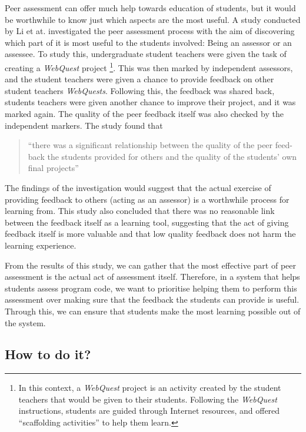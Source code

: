 \documentclass[a4paper,11pt]{report}
\begin{document}
Peer assessment can offer much help towards education of students, but it would be worthwhile to know just which aspects are the most useful. A study conducted by Li et at. \cite{li_assessor_2010} investigated the peer assessment process with the aim of discovering which part of it is most useful to the students involved: Being an assessor or an assessee. To study this, undergraduate student teachers were given the task of creating a \textit{WebQuest} project \footnote{In this context, a \textit{WebQuest} project is an activity created by the student teachers that would be given to their students. Following the \textit{WebQuest} instructions, students are guided through Internet resources, and offered ``scaffolding activities'' to help them learn.}. This was then marked by independent assessors, and the student teachers were given a chance to provide feedback on other student teachers \textit{WebQuests}. Following this, the feedback was shared back, students teachers were given another chance to improve their project, and it was marked again. The quality of the peer feedback itself was also checked by the independent markers. The study found that 
\begin{quote}
``there was a significant relationship between the quality of the peer feed-back the students provided for others and the quality of the students' own final projects''
\end{quote}
The findings of the investigation would suggest that the actual exercise of providing feedback to others (acting as an assessor) is a worthwhile process for learning from. This study also concluded that there was no reasonable link between the feedback itself as a learning tool, suggesting that the act of giving feedback itself is more valuable and that low quality feedback does not harm the learning experience.\par
From the results of this study, we can gather that the most effective part of peer assessment is the actual act of assessment itself. Therefore, in a system that helps students assess program code, we want to prioritise helping them to perform this assessment over making sure that the feedback the students can provide is useful. Through this, we can ensure that students make the most learning possible out of the system.


\subsection{How to do it?}
\end{document}
